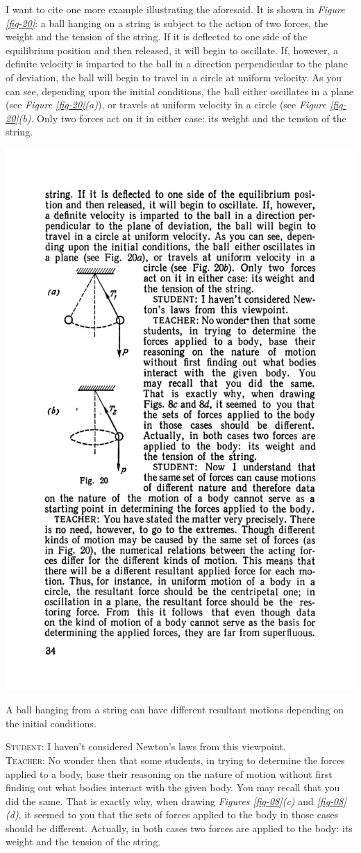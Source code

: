 \documentclass[a4paper,sfsidenotes]{tufte-book}
\begin{document}
I want to cite one more example illustrating the aforesaid. It is shown in \emph{Figure \ref{fig-20}}: a ball hanging on a string is subject to the action of two forces, the weight and the tension of the string. If it is deflected to one side of the equilibrium position and then released, it will begin to oscillate. If, however, a definite velocity is imparted to the ball in a direction perpendicular to the plane of deviation, the ball will begin to travel in a circle at uniform velocity. As you can see, depending upon the initial conditions, the ball either oscillates in a plane (see \emph{Figure \ref{fig-20}(a)}), or travels at uniform velocity in a circle (see \emph{Figure \ref{fig-20}(b)}. Only two forces act on it in either case: its weight and the tension of the string.
\\
\begin{marginfigure}
\centering
\includegraphics[width=0.7\linewidth]{fig-020a.pdf}
\caption{A ball hanging from a string can have different resultant motions depending on the initial conditions.}
\label{fig-20}
\end{marginfigure}
\textsc{Student:} I haven't considered Newton's laws from this viewpoint.
\\
\textsc{Teacher:} No wonder then that some students, in trying to determine the forces applied to a body, base their reasoning on the nature of motion without first finding out what bodies interact with the given body. You may recall that you did the same. That is exactly why, when drawing \emph{Figures \ref{fig-08}(c)} and \emph{\ref{fig-08}(d)}, it seemed to you that the sets of forces applied to the body in those cases should be different. Actually, in both cases two forces are applied to the body: its weight and the tension of the string.
\end{document}
